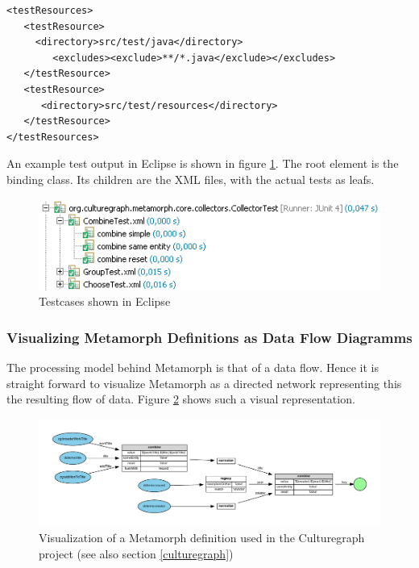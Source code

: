 \documentclass[12pt,a4paper]{article}
\begin{document}
\begin{lstlisting}[float=htb, label=maven_test,caption=Telling Maven not to ignore resources colocated with java files in the test source directory.]
<testResources>
   <testResource>
     <directory>src/test/java</directory>
        <excludes><exclude>**/*.java</exclude></excludes>	
   </testResource>
   <testResource>
      <directory>src/test/resources</directory>
   </testResource>
</testResources> 
\end{lstlisting}

An example test output in Eclipse is shown in figure \ref{fig:junit}. The root element is the binding class. Its children are the XML files, with the actual tests as leafs.

\begin{figure}[htp]
\centering
\includegraphics[width=.75\textwidth]{figures/junit}
\caption{Testcases shown in Eclipse}\label{fig:junit}
\end{figure}

\subsubsection{Visualizing Metamorph Definitions as Data Flow Diagramms}\label{vis}

The processing model behind Metamorph is that of a data flow. Hence it is straight forward to visualize Metamorph as a directed network representing this the resulting flow of data. Figure \ref{fig:match-title} shows such a visual representation. 

\begin{figure}[htp]
\centering
\includegraphics[width=1\textwidth]{figures/match-title}
\caption{Visualization of a Metamorph definition used in the Culturegraph project (see also section \ref{culturegraph})}\label{fig:match-title}
\end{figure}
\end{document}
